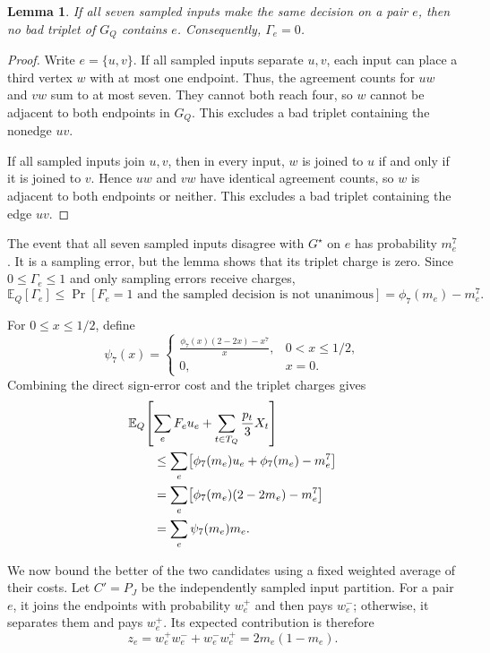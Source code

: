\documentclass[11pt]{article}
\newtheorem{lemma}[theorem]{Lemma}
\theoremstyle{definition}
\theoremstyle{remark}
\newcommand{\1}{\mathbf{1}}
\begin{document}
\begin{lemma}
\label{lem:sampled-unanimity}
If all seven sampled inputs make the same decision on a pair $e$,
then no bad triplet of $G_Q$ contains $e$. Consequently, $\Gamma_e=0$.
\end{lemma}

\begin{proof}
Write $e=\{u,v\}$.
If all sampled inputs separate $u,v$, each input can place a third
vertex $w$ with at most one endpoint.
Thus, the agreement counts for $uw$ and $vw$ sum to at most seven.
They cannot both reach four, so $w$ cannot be adjacent to both
endpoints in $G_Q$. This excludes a bad triplet containing
the nonedge $uv$.

If all sampled inputs join $u,v$, then in every input, $w$ is
joined to $u$ if and only if it is joined to $v$.
Hence $uw$ and $vw$ have identical agreement counts, so $w$ is
adjacent to both endpoints or neither. This excludes a bad triplet
containing the edge $uv$.
\end{proof}

The event that all seven sampled inputs disagree with $G^\star$
on $e$ has probability $m_e^7$. It is a sampling error, but the
lemma shows that its triplet charge is zero.
Since $0\leq\Gamma_e\leq1$ and only sampling errors receive charges,
\[
    \mathbb{E}_Q[\Gamma_e]
    \leq
    \Pr[F_e=1\text{ and the sampled decision is not unanimous}]
    =\phi_7(m_e)-m_e^7.
\]

For $0\leq x\leq1/2$, define
\[
    \psi_7(x)=
    \begin{cases}
        \displaystyle
        \frac{\phi_7(x)(2-2x)-x^7}{x},
        & 0<x\leq1/2,\\[6pt]
        0, & x=0.
    \end{cases}
\]
Combining the direct sign-error cost and the triplet charges
gives
\begin{align}
    &\mathbb E_Q\!\left[
        \sum_e F_eu_e
        +\sum_{t\in T_Q}\frac{p_t}{3}X_t
    \right] \notag\\
    &\qquad\leq \sum_e
        \bigl[\phi_7(m_e)u_e+\phi_7(m_e)-m_e^7\bigr] \notag\\
    &\qquad=\sum_e
        \bigl[\phi_7(m_e)(2-2m_e)-m_e^7\bigr] \notag\\
    &\qquad=\sum_e\psi_7(m_e)m_e.
    \label{eq:sampling-price}
\end{align}

We now bound the better of the two candidates using a fixed
weighted average of their costs. Let $C'=P_J$ be the independently sampled input partition.
For a pair $e$, it joins the endpoints with probability $w_e^+$
and then pays $w_e^-$; otherwise, it separates them and pays $w_e^+$.
Its expected contribution is therefore
\[
    z_e=w_e^+w_e^-+w_e^-w_e^+
       =2m_e(1-m_e).
\]
\end{document}
